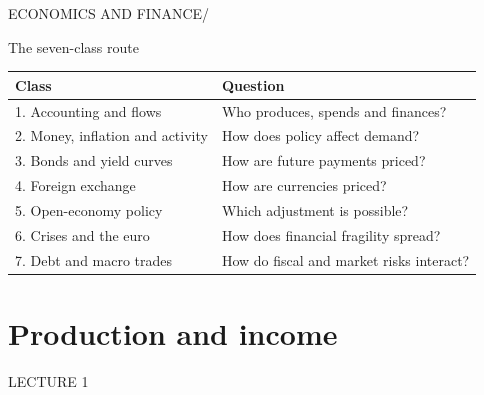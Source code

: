 \documentclass[12pt,aspectratio=169]{beamer}
\begin{document}

\begin{frame}[plain]
{\color{Teal}\large ECONOMICS AND FINANCE\quad /}\par\vspace{9mm}{\Huge\bfseries Output, income and capital flows}\par\vspace{7mm}{\Large How do real resources become income, saving and financial claims?}
\end{frame}


\begin{frame}{The seven-class route}
\begin{center}\begin{tabular}{@{}p{}p{}@{}}\toprule \textbf{Class} & \textbf{Question}\\\midrule 1. Accounting and flows & Who produces, spends and finances?\\[2mm]
2. Money, inflation and activity & How does policy affect demand?\\[2mm]
3. Bonds and yield curves & How are future payments priced?\\[2mm]
4. Foreign exchange & How are currencies priced?\\[2mm]
5. Open-economy policy & Which adjustment is possible?\\[2mm]
6. Crises and the euro & How does financial fragility spread?\\[2mm]
7. Debt and macro trades & How do fiscal and market risks interact?\\\bottomrule\end{tabular}\end{center}
\end{frame}

\section[Production and income]{Production and income}
\begin{frame}[plain]
{\color{Gold}\large LECTURE 1}\par\vspace{9mm}{\Huge\bfseries Production and income}\par\vspace{7mm}{\Large Why can we measure the same economy in three ways?}
\end{frame}
\end{document}

